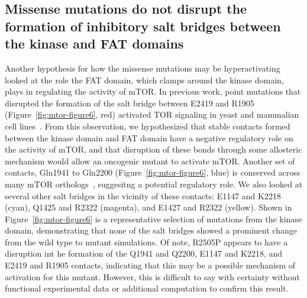 \documentclass[phd,tocprelim]{cornell}
\begin{document}
\subsection{Missense mutations do not disrupt the formation of inhibitory salt bridges between the kinase and FAT domains}
Another hypothesis for how the missense mutations may be hyperactivating looked at the role the FAT domain, which clamps around the kinase domain, plays in regulating the activity of mTOR. In previous work, point mutations that disrupted the formation of the salt bridge between E2419 and R1905 (Figure~\ref{fig:mtor-figure6}, red) activated TOR signaling in yeast and mammalian cell lines~\citep{Urano:2007er}. From this observation, we hypothesized that stable contacts formed between the kinase domain and FAT domain have a negative regulatory role on the activity of mTOR, and that disruption of these bonds through some allosteric mechanism would allow an oncogenic mutant to activate mTOR. Another set of contacts, Gln1941 to Gln2200 (Figure~\ref{fig:mtor-figure6}, blue) is conserved across many mTOR orthologs~\citep{Yang:2013gaa}, suggesitng a potential regulatory role. We also looked at several other salt bridges in the vicinity of these contacts: E1147 and K2218 (cyan), Q1425 and R2322 (magenta), and E1427 and R2322 (yellow). Shown in Figure~\ref{fig:mtor-figure6} is a representative selection of mutations from the kinase domain, demonstrating that none of the salt bridges showed a prominent change from the wild type to mutant simulations. Of note, R2505P appears to have a disruption int he formation of the Q1941 and Q2200,  E1147 and K2218, and E2419 and R1905 contacts, indicating that this may be a possible mechanism of activation for this mutant. However, this is difficult to say with certainty without functional experimental data or additional computation to confirm this result. 
\end{document}
